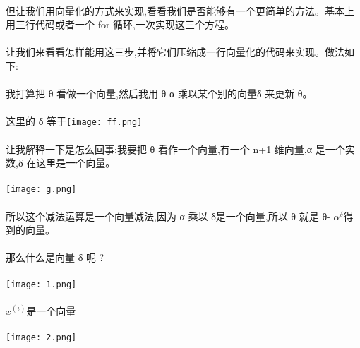 \documentclass{article}
\begin{document}
\begin{CJK}{UTF8}{gbsn}
\paragraph{}
但让我们用向量化的方式来实现,看看我们是否能够有一个更简单的方法。基本上用三行代码或者一个 for 循环,一次实现这三个方程。
\paragraph{}
让我们来看看怎样能用这三步,并将它们压缩成一行向量化的代码来实现。做法如下:
\paragraph{}
我打算把 θ 看做一个向量,然后我用 θ-α 乘以某个别的向量δ 来更新 θ。
\paragraph{}
这里的 δ 等于\texttt{[image: ff.png]}
\paragraph{}
让我解释一下是怎么回事:我要把 θ 看作一个向量,有一个 n+1 维向量,α 是一个实数,δ 在这里是一个向量。
\paragraph{}
\texttt{[image: g.png]}
\paragraph{}
所以这个减法运算是一个向量减法,因为 α 乘以 δ是一个向量,所以 θ 就是 θ- $\alpha^{\delta}$得到的向量。
\paragraph{}
那么什么是向量 δ 呢 ?
\paragraph{}
\texttt{[image: 1.png]}
\paragraph{}
$x^{(i)}$是一个向量
\paragraph{}
\texttt{[image: 2.png]}

\end{CJK}
\end{document}

